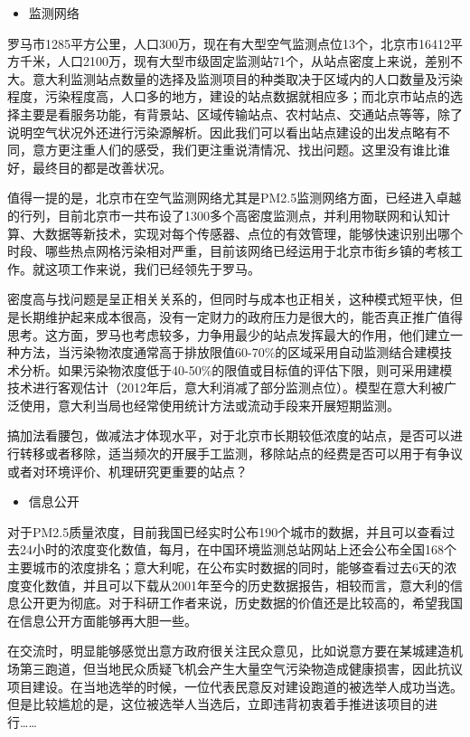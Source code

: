 \documentclass[
]{book}
\providecommand{\tightlist}{%
  \setlength{\itemsep}{0pt}\setlength{\parskip}{0pt}}
\begin{document}
\begin{itemize}
\tightlist
\item
  监测网络
\end{itemize}

罗马市1285平方公里，人口300万，现在有大型空气监测点位13个，北京市16412平方千米，人口2100万，现有大型市级固定监测站71个，从站点密度上来说，差别不大。意大利监测站点数量的选择及监测项目的种类取决于区域内的人口数量及污染程度，污染程度高，人口多的地方，建设的站点数据就相应多；而北京市站点的选择主要是看服务功能，有背景站、区域传输站点、农村站点、交通站点等等，除了说明空气状况外还进行污染源解析。因此我们可以看出站点建设的出发点略有不同，意方更注重人们的感受，我们更注重说清情况、找出问题。这里没有谁比谁好，最终目的都是改善状况。

值得一提的是，北京市在空气监测网络尤其是PM2.5监测网络方面，已经进入卓越的行列，目前北京市一共布设了1300多个高密度监测点，并利用物联网和认知计算、大数据等新技术，实现对每个传感器、点位的有效管理，能够快速识别出哪个时段、哪些热点网格污染相对严重，目前该网络已经运用于北京市街乡镇的考核工作。就这项工作来说，我们已经领先于罗马。

密度高与找问题是呈正相关关系的，但同时与成本也正相关，这种模式短平快，但是长期维护起来成本很高，没有一定财力的政府压力是很大的，能否真正推广值得思考。这方面，罗马也考虑较多，力争用最少的站点发挥最大的作用，他们建立一种方法，当污染物浓度通常高于排放限值60-70\%的区域采用自动监测结合建模技术分析。如果污染物浓度低于40-50\%的限值或目标值的评估下限，则可采用建模技术进行客观估计（2012年后，意大利消减了部分监测点位）。模型在意大利被广泛使用，意大利当局也经常使用统计方法或流动手段来开展短期监测。

搞加法看腰包，做减法才体现水平，对于北京市长期较低浓度的站点，是否可以进行转移或者移除，适当频次的开展手工监测，移除站点的经费是否可以用于有争议或者对环境评价、机理研究更重要的站点？

\begin{itemize}
\tightlist
\item
  信息公开
\end{itemize}

对于PM2.5质量浓度，目前我国已经实时公布190个城市的数据，并且可以查看过去24小时的浓度变化数值，每月，在中国环境监测总站网站上还会公布全国168个主要城市的浓度排名；意大利呢，在公布实时数据的同时，能够查看过去6天的浓度变化数值，并且可以下载从2001年至今的历史数据报告，相较而言，意大利的信息公开更为彻底。对于科研工作者来说，历史数据的价值还是比较高的，希望我国在信息公开方面能够再大胆一些。

在交流时，明显能够感觉出意方政府很关注民众意见，比如说意方要在某城建造机场第三跑道，但当地民众质疑飞机会产生大量空气污染物造成健康损害，因此抗议项目建设。在当地选举的时候，一位代表民意反对建设跑道的被选举人成功当选。但是比较尴尬的是，这位被选举人当选后，立即违背初衷着手推进该项目的进行\ldots\ldots{}
\end{document}
